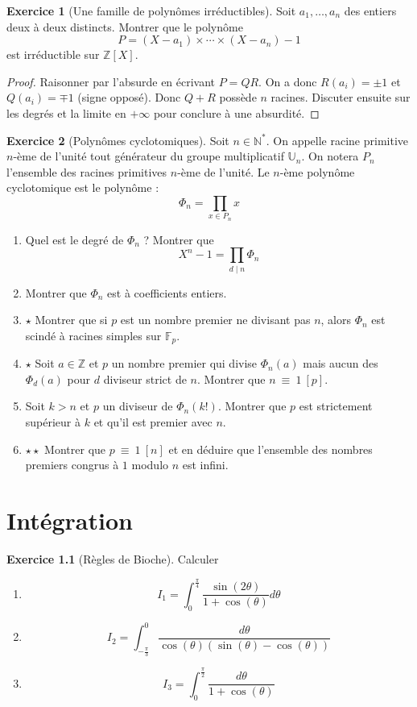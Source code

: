 \documentclass[french]{book}
\newcommand{\N}{\mathbb{N}}
\newcommand{\Z}{\mathbb{Z}}
\newcommand{\U}{\mathbb{U}}
\newcommand{\st}{^*}
\newcommand{\F}{\mathbb{F}}
\theoremstyle{definition}
\newtheorem{ex}{Exercice}[chapter]
\theoremstyle{theorem}
\theoremstyle{remark}
\begin{document}
\begin{ex}[Une famille de polynômes irréductibles]
	Soit $a_1,\ldots,a_n$ des entiers deux à deux distincts. Montrer que le polynôme $$P=(X-a_1)\times\cdots\times(X-a_n)-1$$ est irréductible sur $\Z[X]$.
\end{ex}

\begin{proof}
	Raisonner par l'absurde en écrivant $P=QR$. On a donc $R(a_i)=\pm 1$ et $Q(a_i)=\mp 1$ (signe opposé). Donc $Q+R$ possède $n$ racines. Discuter ensuite sur les degrés et la limite en $+\infty$ pour conclure à une absurdité.
\end{proof}

\begin{ex}[Polynômes cyclotomiques]
	Soit $n\in\N\st$. On appelle racine primitive $n$-ème de l'unité tout générateur du groupe multiplicatif $\U_n$. On notera $P_n$ l'ensemble des racines primitives $n$-ème de l'unité. Le $n$-ème polynôme cyclotomique est le polynôme : $$\Phi_n=\prod_{x\in P_n}x$$
	\begin{enumerate}
		\item Quel est le degré de $\Phi_n$ ? Montrer que $$X^n-1=\prod_{d\mid n}\Phi_n$$
		\item Montrer que $\Phi_n$ est à coefficients entiers.
		\item $\star$ Montrer que si $p$ est un nombre premier ne divisant pas $n$, alors $\Phi_n$ est scindé à racines simples sur $\F_p$. 
		\item $\star$ Soit $a\in\Z$ et $p$ un nombre premier qui divise $\Phi_n(a)$ mais aucun des $\Phi_d(a)$ pour $d$ diviseur strict de $n$. Montrer que $n\ \equiv\ 1\ [p]$.
		\item Soit $k>n$ et $p$ un diviseur de $\Phi_n(k!)$. Montrer que $p$ est strictement supérieur à $k$ et qu'il est premier avec $n$.
		\item $\star\star$ Montrer que $p\ \equiv\ 1\ [n]$ et en déduire que l'ensemble des nombres premiers congrus à $1$ modulo $n$ est infini.
	\end{enumerate}
\end{ex}

\chapter{Intégration}

\begin{ex}[Règles de Bioche]
	Calculer
	\begin{enumerate}
		\item $$I_1=\int_{0}^{\frac{\pi}{4}} \frac{\sin(2\theta)}{1+\cos(\theta)} d\theta$$
		\item $$I_2=\int_{-\frac{\pi}{3}}^{0} \frac{d\theta}{\cos(\theta)(\sin(\theta)-\cos(\theta))}$$
		\item $$I_3=\int_{0}^{\frac{\pi}{2}} \frac{d\theta}{1+\cos(\theta)}$$
	\end{enumerate}
\end{ex}
\end{document}
